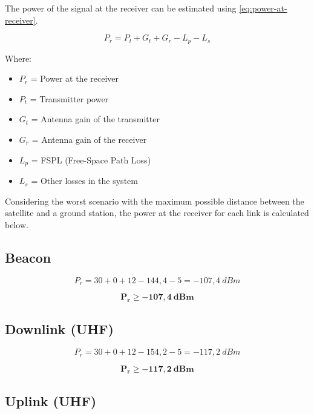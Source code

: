 The power of the signal at the receiver can be estimated using \autoref{eq:power-at-receiver}.

\begin{equation} \label{eq:power-at-receiver}
    P_{r} = P_{t} + G_{t} + G_{r} - L_{p} - L_{s}
\end{equation}

Where:

\begin{itemize}
    \item $P_{r}$ = Power at the receiver
    \item $P_{t}$ = Transmitter power
    \item $G_{t}$ = Antenna gain of the transmitter
    \item $G_{r}$ = Antenna gain of the receiver
    \item $L_{p}$ = FSPL (Free-Space Path Loss)
    \item $L_{s}$ = Other losses in the system
\end{itemize}

Considering the worst scenario with the maximum possible distance between the satellite and a ground station, the power at the receiver for each link is calculated below.

\subsection{Beacon}

\begin{equation}
    P_{r} = 30 + 0 + 12 - 144,4 - 5 = -107,4\ dBm
\end{equation}

\begin{equation}
    \mathbf{P_{r} \geq -107,4\ dBm}
\end{equation}

\subsection{Downlink (UHF)}

\begin{equation}
    P_{r} = 30 + 0 + 12 - 154,2 - 5 = -117,2\ dBm
\end{equation}

\begin{equation}
    \mathbf{P_{r} \geq -117,2\ dBm}
\end{equation}

\subsection{Uplink (UHF)}

